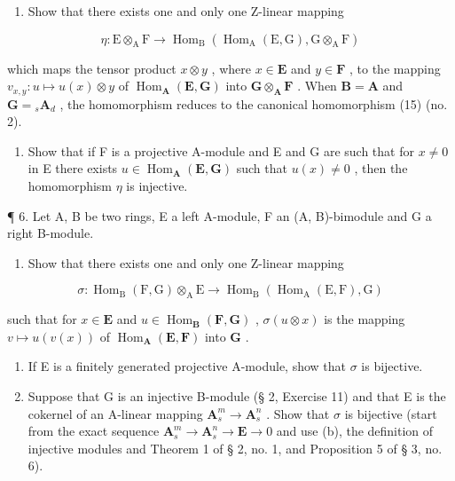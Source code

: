 \begin{enumerate}
\def\labelenumi{(\alph{enumi})}
\tightlist
\item
  Show that there exists one and only one Z-linear mapping
\end{enumerate}

\[
\eta : \mathrm{E} \otimes_ {\mathrm{A}} \mathrm{F} \rightarrow \operatorname{Hom} _ {\mathrm{B}} (\operatorname{Hom} _ {\mathrm{A}} (\mathrm{E}, \mathrm{G}), \mathrm{G} \otimes_ {\mathrm{A}} \mathrm{F})
\]

which maps the tensor product \(x \otimes y\) , where \(x \in \mathbf{E}\) and \(y \in \mathbf{F}\) , to the mapping \(v_{x,y}: u \mapsto u(x) \otimes y\) of \(\operatorname{Hom}_{\mathbf{A}}(\mathbf{E}, \mathbf{G})\) into \(\mathbf{G} \otimes_{\mathbf{A}} \mathbf{F}\) . When \(\mathbf{B} = \mathbf{A}\) and \(\mathbf{G} = {}_s\mathbf{A}_d\) , the homomorphism reduces to the canonical homomorphism (15) (no. 2).

\begin{enumerate}
\def\labelenumi{(\alph{enumi})}
\setcounter{enumi}{1}
\tightlist
\item
  Show that if F is a projective A-module and E and G are such that for \(x \neq 0\) in E there exists \(u \in \operatorname{Hom}_{\mathbf{A}}(\mathbf{E}, \mathbf{G})\) such that \(u(x) \neq 0\) , then the homomorphism \(\eta\) is injective.
\end{enumerate}

¶ 6. Let A, B be two rings, E a left A-module, F an (A, B)-bimodule and G a right B-module.

\begin{enumerate}
\def\labelenumi{(\alph{enumi})}
\tightlist
\item
  Show that there exists one and only one Z-linear mapping
\end{enumerate}

\[
\sigma : \operatorname{Hom} _ {\mathrm{B}} (\mathrm{F}, \mathrm{G}) \otimes_ {\mathrm{A}} \mathrm{E} \rightarrow \operatorname{Hom} _ {\mathrm{B}} (\operatorname{Hom} _ {\mathrm{A}} (\mathrm{E}, \mathrm{F}), \mathrm{G})
\]

such that for \(x \in \mathbf{E}\) and \(u \in \operatorname{Hom}_{\mathbf{B}}(\mathbf{F}, \mathbf{G})\) , \(\sigma(u \otimes x)\) is the mapping \(v \mapsto u(v(x))\) of \(\operatorname{Hom}_{\mathbf{A}}(\mathbf{E}, \mathbf{F})\) into \(\mathbf{G}\) .

\begin{enumerate}
\def\labelenumi{(\alph{enumi})}
\setcounter{enumi}{1}
\item
  If E is a finitely generated projective A-module, show that \(\sigma\) is bijective.
\item
  Suppose that G is an injective B-module (§ 2, Exercise 11) and that E is the cokernel of an A-linear mapping \(\mathbf{A}_s^m \to \mathbf{A}_s^n\) . Show that \(\sigma\) is bijective (start from the exact sequence \(\mathbf{A}_s^m \to \mathbf{A}_s^n \to \mathbf{E} \to 0\) and use (b), the definition of injective modules and Theorem 1 of § 2, no. 1, and Proposition 5 of § 3, no. 6).
\end{enumerate}

